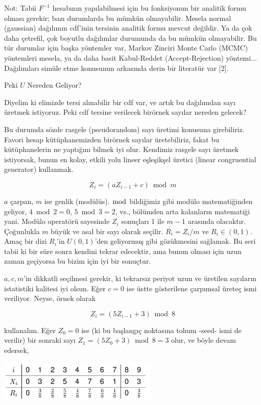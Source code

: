 \documentclass[12pt,fleqn]{article}\usepackage{../../common}
\begin{document}
Not: Tabii $F^{-1}$ hesabının yapılabilmesi için bu fonksiyonun bir
analitik formu olması gerekir; bazı durumlarda bu mümkün
olmayabilir. Mesela normal (gaussian) dağılımın cdf'inin tersinin analitik
formu mevcut değildir. Ya da çok daha çetrefil, çok boyutlu dağılımlar
durumunda da bu mümkün olmayabilir. Bu tür durumlar için başka yöntemler
var, Markov Zinciri Monte Carlo (MCMC) yöntemleri mesela, ya da daha basit
Kabul-Reddet (Accept-Rejection) yöntemi... Dağılımları simüle etme
konusunun arkasında derin bir literatür var [2].

Peki $U$ Nereden Geliyor? 

Diyelim ki elimizde tersi alınabilir bir cdf var, ve artık bu dağılımdan
sayı üretmek istiyoruz. Peki cdf tersine verilecek birörnek sayılar nereden
gelecek?

Bu durumda sözde rasgele (pseudorandom) sayı üretimi konusuna
girebiliriz. Favori hesap kütüphanemizden birörnek sayılar üretebiliriz,
fakat bu kütüphanelerin ne yaptığını bilmek iyi olur. Kendimiz rasgele sayı
üretmek istiyorsak, bunun en kolay, etkili yolu lineer eşleşikşel üretici
(linear congruential generator) kullanmak.

$$ Z_i = (a Z_{i-1} + c) \bmod m $$

$a$ çarpan, $m$ ise genlik (modülüs). $\bmod$ bildiğimiz gibi modülo
matematiğinden geliyor, $4 \bmod 2 = 0$, $5 \bmod 3 = 2$, vs., bölümden
arta kalanların matematiği yani. Modülo operatörü sayesinde $Z_i$ sonuçları
1 ile $m-1$ arasında olacaktır. Çoğunlukla $m$ büyük ve asal bir sayı
olarak seçilir. $R_i = Z_i / m$ ve $R_i \in (0,1)$. Amaç bir dizi $R_i$'in
$U(0,1)$'den  geliyormuş gibi gözükmesini sağlamak. Bu seri tabii ki bir 
süre sonra kendini tekrar edecektir, ama bunun olması için uzun zaman 
geçiyorsa bu bizim için iyi bir sonuçtur. 

$a,c,m$'in dikkatli seçilmesi gerekir, ki tekrarsız periyot uzun ve
üretilen sayıların istatistiki kalitesi iyi olsun. Eğer $c=0$ ise üstte
gösterilene çarpımsal üreteç ismi veriliyor. Neyse, örnek olarak 

$$ Z_i = (5 Z_{i-1} + 3) \bmod 8 $$

kullanalım. Eğer $Z_0 = 0$ ise (ki bu başlangıç noktasına tohum -seed- ismi
de verilir) bir sonraki sayı $Z_1 = (5 Z_0 + 3) \bmod 8 = 3$ olur, ve böyle
devam edersek,

\includegraphics[height=2cm]{stat_fxu_01.png}
\end{document}
